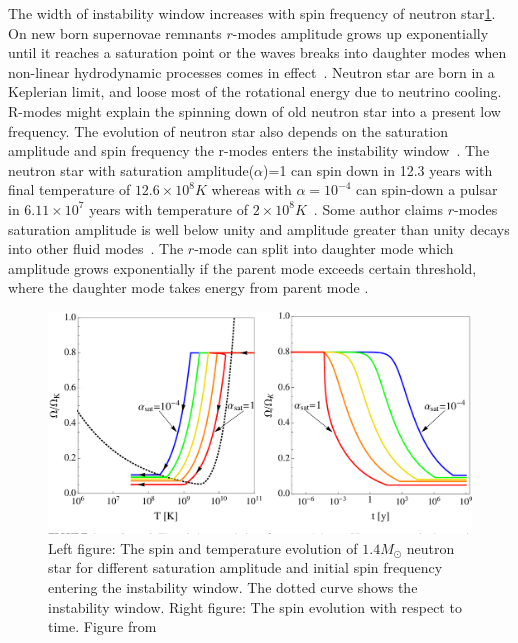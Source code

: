 \documentclass{ttuthes2007}
\begin{document}
The width of instability window increases with spin
frequency of neutron star\ref{fig:instability}. On new born supernovae remnants
$r$-modes amplitude grows up exponentially until it reaches a saturation point or
the waves breaks into daughter modes when non-linear hydrodynamic processes
comes in effect~\cite{Owen_1998}. Neutron star are born in a Keplerian limit,
and loose most of the rotational energy due to neutrino cooling.  R-modes might explain the spinning down of old
neutron star into a present low frequency. The evolution of neutron star also
depends on the saturation amplitude and spin frequency the r-modes enters
the instability window~\cite{Alford_2014}. The neutron star with
saturation amplitude($\alpha$)=1 can spin down in 12.3 years with final
temperature of $12.6 \times 10^8 K$ whereas with $\alpha=10^{-4}$ can spin-down a
pulsar in $6.11 \times 10^7$ years with temperature of $2 \times 10^8
K$~\cite{Alford_2014}. Some author claims
$r$-modes saturation amplitude is well below unity and amplitude greater than
unity decays into other fluid modes~\cite{Gressman_2002}. The $r$-mode can split
into daughter mode which amplitude grows exponentially if the parent mode
exceeds certain threshold, where the daughter mode takes energy from parent mode
\cite{Arras_2003}.
\begin{figure}[bht!]                                                            
        \includegraphics[width=\textwidth]{figure/rmodesamplitude.png}                         
	\caption{Left figure: The spin and temperature  evolution of $1.4 M_\odot$ neutron star
for different saturation amplitude and initial spin frequency entering the
instability window. The dotted curve shows the instability window. Right figure: The spin evolution with respect to time. Figure from ~\cite{Alford_2014}}
        \label{fig:instability}                                                     
\end{figure}  
\end{document}
